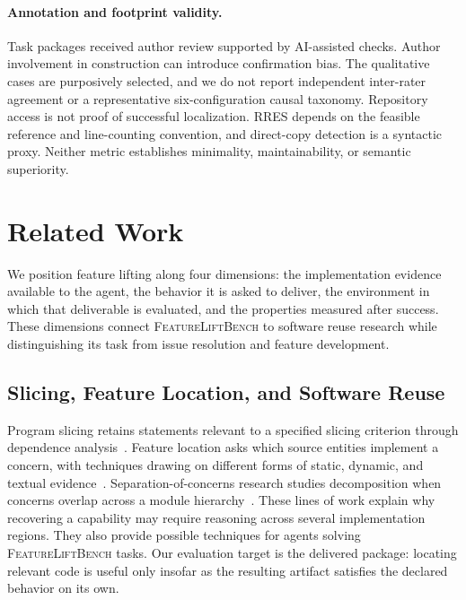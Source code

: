 \documentclass[acmsmall,screen,review,anonymous,nonacm]{acmart}
\newcommand{\flb}{\textsc{FeatureLiftBench}\xspace}
\begin{document}
\paragraph{Annotation and footprint validity.}
Task packages received author review supported by AI-assisted checks. Author
involvement in construction can introduce confirmation bias. The qualitative
cases are purposively selected, and we do not report independent inter-rater
agreement or a representative six-configuration causal taxonomy. Repository access is
not proof of successful localization. RRES depends on the feasible reference
and line-counting convention, and direct-copy detection is a syntactic proxy.
Neither metric establishes minimality, maintainability, or semantic superiority.


\section{Related Work}
\label{sec:related-work}

We position feature lifting along four dimensions: the implementation evidence
available to the agent, the behavior it is asked to deliver, the environment in
which that deliverable is evaluated, and the properties measured after success.
These dimensions connect \flb to software reuse research while distinguishing
its task from issue resolution and feature development.

\subsection{Slicing, Feature Location, and Software Reuse}

Program slicing retains statements relevant to a specified slicing
criterion through dependence analysis~\cite{weiser1984slicing}. Feature location
asks which source entities implement a concern, with techniques drawing on
different forms of static, dynamic, and textual
evidence~\cite{dit2013featurelocation}. Separation-of-concerns research studies
decomposition when concerns overlap across a module
hierarchy~\cite{tarr1999degrees}. These lines of work explain why recovering a
capability may require reasoning across several implementation regions.
They also provide possible techniques for agents solving \flb tasks.
Our evaluation target is the delivered package: locating relevant code is useful
only insofar as the resulting artifact satisfies the declared behavior on its own.
\end{document}
